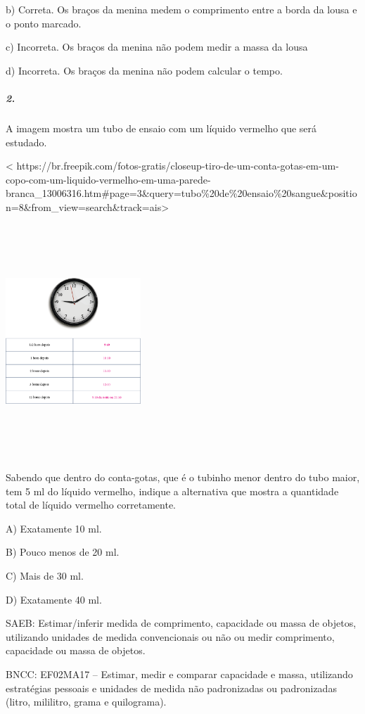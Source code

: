 b) Correta. Os braços da menina medem o comprimento entre a borda da
lousa e o ponto marcado.

c) Incorreta. Os braços da menina não podem medir a massa da lousa

d) Incorreta. Os braços da menina não podem calcular o tempo.

\subparagraph{2. }\label{section-40}

A imagem mostra um tubo de ensaio com um líquido vermelho que será estudado.

\textless{}
https://br.freepik.com/fotos-gratis/closeup-tiro-de-um-conta-gotas-em-um-copo-com-um-liquido-vermelho-em-uma-parede-branca\_13006316.htm\#page=3\&query=tubo\%20de\%20ensaio\%20sangue\&position=8\&from\_view=search\&track=ais\textgreater{}

\includegraphics[width=2.00003in,height=3.45840in]{media/image56.png}

Sabendo que dentro do conta-gotas, que é o tubinho menor dentro do tubo
maior, tem 5 ml do líquido vermelho, indique a alternativa que mostra a
quantidade total de líquido vermelho corretamente.

A) Exatamente 10 ml.

B) Pouco menos de 20 ml.

C) Mais de 30 ml.

D) Exatamente 40 ml.

SAEB: Estimar/inferir medida de comprimento, capacidade ou
massa de objetos, utilizando unidades de medida convencionais ou não ou
medir comprimento, capacidade ou massa de objetos.

BNCC: EF02MA17 -- Estimar, medir e comparar capacidade e massa,
utilizando estratégias pessoais e unidades de medida não padronizadas ou padronizadas (litro, mililitro,
grama e quilograma).

